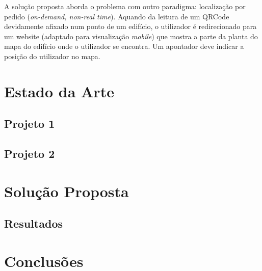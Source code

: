 \documentclass[twocolumn,twoside,11pt]{article}
\begin{document}
  A solução proposta aborda o problema com outro paradigma: localização por pedido (\emph{on-demand, non-real time}).
  Aquando da leitura de um QRCode devidamente afixado num ponto de um edifício, o utilizador é redirecionado para um website (adaptado para visualização \emph{mobile}) que mostra a parte da planta do mapa do edifício onde o utilizador se encontra.
  Um apontador deve indicar a posição do utilizador no mapa.



\section{Estado da Arte} %
\label{sec:state_of_the_art}

\lipsum[3]

\subsection{Projeto 1} %
\label{sub:projeto_1}
\lipsum[2]


\subsection{Projeto 2} %
\label{sub:projeto_2}
\lipsum[7]




\section{Solução Proposta} %
\label{sec:solucao}

\lipsum[8]

\subsection{Resultados} %
\label{sub:resultados}
\lipsum[3]



\section{Conclusões}\label{sec:conclusions}

\lipsum[8]


\renewcommand{\bibname}{Referências}
%
%

%


\end{document}
